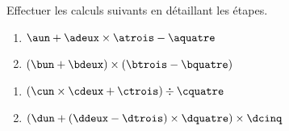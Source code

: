 \documentclass{/home/nyaucki/Documents/Prof/CoursMaths/mycls/DevoirMaison}
\begin{document}
\renewcommand{\nom}{} 

\renewcommand{\prenom}{}



Effectuer les calculs suivants en détaillant les étapes.

\begin{multicols}{2}
	\begin{enumerate}[label=\alph*.]
		\item $\aun + \adeux \times \atrois - \aquatre$  \vspace*{7em}
		\item $(\bun +\bdeux)\times (\btrois -\bquatre)$ \vspace*{7em}
	\end{enumerate}
\end{multicols}

\begin{multicols}{2}
	\begin{enumerate}[start=3,label=\alph*.]
		\item $(\cun \times \cdeux +\ctrois ) \div \cquatre$  \vspace*{8em}
		\item $(\dun + (\ddeux -\dtrois)\times \dquatre)\times \dcinq$ \vspace*{8em}
	\end{enumerate}
\end{multicols}
\end{document}
